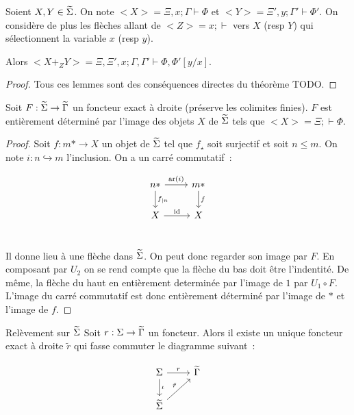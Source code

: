 \begin{lem}
    Soient $X,Y\in\widetilde{\Sigma}$. On note $<X> = \Xi,x;\Gamma\vdash\Phi$ et
    $<Y> = \Xi',y;\Gamma'\vdash\Phi'$. On considère de plus les flèches allant de
    $<Z> = x;\vdash$ vers $X$ (resp $Y$) qui sélectionnent la variable $x$ (resp $y$).

    Alors $<X +_Z Y> = \Xi,\Xi',x;\Gamma,\Gamma'\vdash\Phi,\Phi'[y/x]$.
\end{lem}

\begin{proof}
    Tous ces lemmes sont des conséquences directes du théorème TODO.
\end{proof}

\begin{prop}
    Soit $F:\widetilde{\Sigma}\rightarrow\widetilde{\Gamma}$ un foncteur exact à droite (préserve les colimites
    finies).
    $F$ est entièrement déterminé
    par l'image des objets $X$ de $\widetilde{\Sigma}$ tels que $<X> = \Xi;\vdash \Phi$.
\end{prop}

\begin{proof}
    Soit $f:m\ast\rightarrow X$ un objet de $\widetilde{\Sigma}$ tel que $f_\star$ soit surjectif
    et soit $n\leq m$.
    On note $i:n\hookrightarrow m$ l'inclusion.
    On a un carré commutatif~:

    \[\begin{tikzcd}
        n\ast\arrow[r, "\text{ar}(i)"]\arrow[d, "f_{|n}"] & m\ast\arrow[d, "f"] \\
        X\arrow[r, "\id"] & X \\
    \end{tikzcd}\]

    Il donne lieu à une flèche dans $\widetilde{\Sigma}$. On peut donc regarder son image par $F$.
    En composant par $U_2$ on se rend compte que la flèche du bas doit être l'indentité.
    De même, la flèche du haut en entièrement determinée par l'image de $1$ par
    $U_1\circ F$. L'image du carré commutatif est donc entièrement déterminé par
    l'image de $\ast$ et l'image de $f$.
\end{proof}

\begin{theo}{Relèvement sur $\widetilde{\Sigma}$}
    Soit $r : \Sigma\rightarrow\widetilde{\Gamma}$ un foncteur. Alors il existe un unique foncteur
    exact à droite $\tilde{r}$ qui fasse commuter le diagramme suivant~:

    \[\begin{tikzcd}
        \Sigma\arrow[d, "\iota"]\arrow[r, "r"] & \tgamma \\
        \tsigma\arrow[ur, "\tilde{r}"] & \\
    \end{tikzcd}\]
\end{theo}

